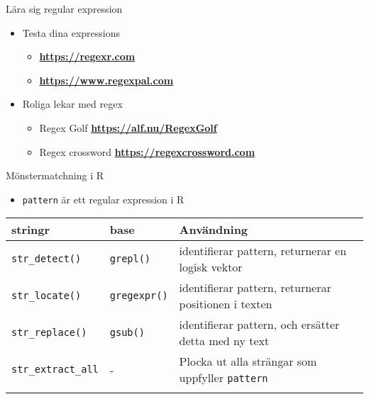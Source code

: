 \documentclass[
  10pt,
  ignorenonframetext,
  handout]{beamer}
\providecommand{\tightlist}{%
  \setlength{\itemsep}{0pt}\setlength{\parskip}{0pt}}
\begin{document}
\begin{frame}{Lära sig regular expression}
\label{luxe4ra-sig-regular-expression}
\begin{itemize}
\tightlist
\item
  Testa dina expressions

  \begin{itemize}
  \tightlist
  \item
    \textbf{\url{https://regexr.com}}
  \item
    \textbf{\url{https://www.regexpal.com}}
  \end{itemize}
\item
  Roliga lekar med regex

  \begin{itemize}
  \tightlist
  \item
    Regex Golf \textbf{\url{https://alf.nu/RegexGolf}}
  \item
    Regex crossword \textbf{\url{https://regexcrossword.com}}
  \end{itemize}
\end{itemize}
\end{frame}

\begin{frame}[fragile]{Mönstermatchning i R}
\label{muxf6nstermatchning-i-r}
\begin{itemize}
\tightlist
\item
  \texttt{pattern} är ett regular expression i R
\end{itemize}

\begin{longtable}[]{@{}
  >{\raggedright\arraybackslash}p{}
  >{\raggedright\arraybackslash}p{}
  >{\raggedright\arraybackslash}p{}@{}}
\toprule\noalign{}
\begin{minipage}[b]{\linewidth}\raggedright
stringr
\end{minipage} & \begin{minipage}[b]{\linewidth}\raggedright
base
\end{minipage} & \begin{minipage}[b]{\linewidth}\raggedright
Användning
\end{minipage} \\
\midrule\noalign{}
\endhead
\texttt{str\_detect()} & \texttt{grepl()} & identifierar pattern,
returnerar en logisk vektor \\
\texttt{str\_locate()} & \texttt{gregexpr()} & identifierar pattern,
returnerar positionen i texten \\
\texttt{str\_replace()} & \texttt{gsub()} & identifierar pattern, och
ersätter detta med ny text \\
\texttt{str\_extract\_all} & - & Plocka ut alla strängar som uppfyller
\texttt{pattern} \\
\bottomrule\noalign{}
\end{longtable}
\end{frame}
\end{document}
